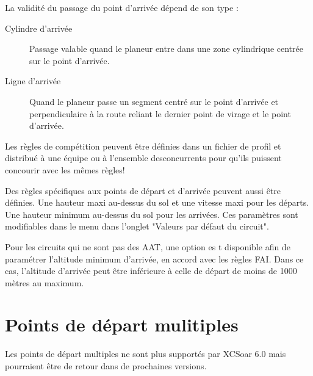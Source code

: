 La validité du passage du point d'arrivée dépend de son type :
\begin{description}
\item[Cylindre d'arrivée] Passage valable quand le planeur entre dans une zone cylindrique centrée sur le point d'arrivée.
\item[Ligne d'arrivée] Quand le planeur passe un segment centré sur le point d'arrivée et perpendiculaire à la route reliant le dernier point de virage et le point d'arrivée.
\end{description}


Les règles de compétition peuvent être définies dans un fichier de profil et distribué à une équipe ou à l'ensemble des\tip concurrents pour qu'ils puissent concourir avec les mêmes règles!

Des règles spécifiques aux points de départ et d'arrivée peuvent aussi être définies. Une hauteur maxi au-dessus du sol et une vitesse maxi pour les départs. Une hauteur minimum au-dessus du sol pour les arrivées. Ces paramètres sont modifiables dans le menu  \blink{} dans l'onglet "Valeurs par défaut du circuit".

Pour les circuits qui ne sont pas des AAT, une option es t disponible afin de paramétrer l'altitude minimum d'arrivée, en accord avec les règles FAI. Dans ce cas, l'altitude d'arrivée peut être inférieure à celle de départ de moins de 1000 mètres au maximum.

\section{Points de départ mulitiples}\label{sec:alternate-starts}

Les points de départ multiples ne sont plus supportés par XCSoar 6.0 mais pourraient être de retour dans de prochaines versions.


  

